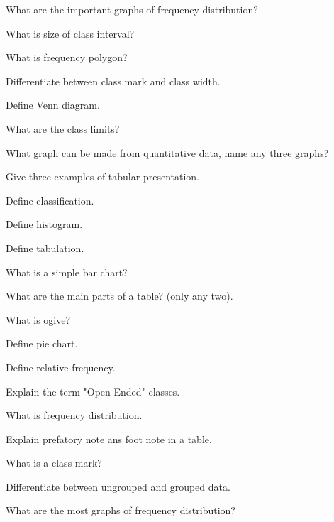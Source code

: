 \documentclass[11pt,a4paper]{article}
\begin{document}
\begin{shortlist}
\item What are the important graphs of frequency distribution?

\item What is size of class interval?

\item What is frequency polygon?

\item Differentiate between class mark and class width.

\item Define Venn diagram.

\item What are the class limits?

\item What graph can be made from quantitative data, name any three graphs?

\item Give three examples of tabular presentation.

\item Define classification.

\item Define histogram.

\item Define tabulation.

\item What is a simple bar chart?

\item What are the main parts of a table? (only any two).

\item What is ogive?

\item Define pie chart.

\item Define relative frequency.

\item Explain the term "Open Ended" classes.

\item What is frequency distribution.

\item Explain prefatory note ans foot note in a table.

\item What is a class mark?

\item Differentiate between ungrouped and grouped data.

\item What are the most graphs of frequency distribution?


\end{shortlist}
\end{document}

